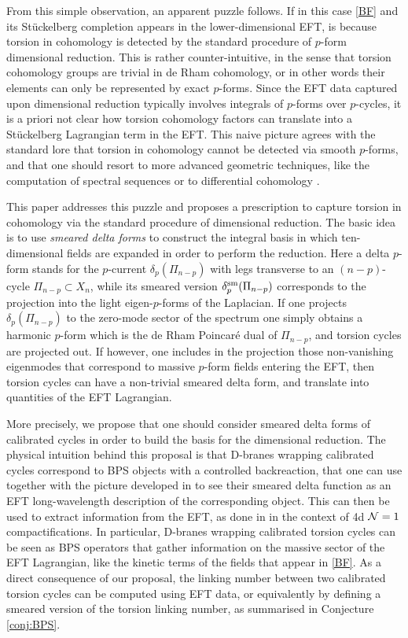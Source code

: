 \documentclass[11pt]{article}
\def\CN {{\cal N}}
\begin{document}
From this simple observation, an apparent puzzle follows. If in this case \eqref{BF} and its St\"uckelberg  completion appears in the lower-dimensional EFT, is because torsion in cohomology is detected by the standard procedure of $p$-form dimensional reduction. This is rather counter-intuitive, in the sense that torsion cohomology groups are trivial in de Rham cohomology, or in other words their elements can only be represented by exact $p$-forms. Since the EFT data captured upon dimensional reduction typically involves integrals of $p$-forms over $p$-cycles, it is a priori not clear how torsion cohomology factors can translate into a St\"uckelberg  Lagrangian term in the EFT. This naive picture agrees with the standard lore that torsion in cohomology cannot be detected via smooth $p$-forms, and that one should resort to more advanced geometric techniques, like the computation of spectral sequences  \cite{Bott1982DifferentialFI} or to differential cohomology \cite{Apruzzi:2021nmk}.


This paper addresses this puzzle and proposes a prescription to capture torsion in cohomology via the standard procedure of dimensional reduction. The basic idea is to use {\em smeared delta forms} to construct the integral basis in which ten-dimensional fields are expanded in order to perform the reduction. Here a delta $p$-form stands for the $p$-current $\delta_p(\Pi_{n-p})$ with legs transverse to an $(n-p)$-cycle $\Pi_{n-p} \subset X_n$, while its smeared version $\delta_p^{\rm sm}(\Pi_{n-p})$ corresponds to the projection into the light eigen-$p$-forms of the Laplacian. If one projects $\delta_p(\Pi_{n-p})$ to the zero-mode sector of the spectrum one simply obtains a harmonic $p$-form which is the de Rham Poincar\'e dual of $\Pi_{n-p}$, and torsion cycles are projected out. If however, one includes in the projection those non-vanishing eigenmodes that correspond to massive $p$-form fields entering the EFT, then torsion cycles can have a non-trivial smeared delta form, and translate into quantities of the EFT Lagrangian. 

More precisely, we propose that one should consider smeared delta forms of calibrated cycles in order to build the basis for the dimensional reduction. The physical intuition behind this proposal is that D-branes wrapping calibrated cycles correspond to BPS objects with a controlled backreaction, that one can use together with the picture developed in \cite{Goldberger:2001tn,Michel:2014lva,Polchinski:2015bea} to see their smeared delta function as an EFT long-wavelength description of the corresponding object.  This can then be used to extract information from the EFT, as done in \cite{Lanza:2020qmt,Lanza:2021udy,Lanza:2022zyg} in the context of 4d $\CN=1$ compactifications. In particular, D-branes wrapping calibrated torsion cycles can be seen as BPS operators that gather information on the massive sector of the EFT Lagrangian, like the kinetic terms of the fields that appear in \eqref{BF}. As a direct consequence of our proposal, the linking number between two calibrated torsion cycles can be computed using EFT data, or equivalently by defining a smeared version of the torsion linking number, as summarised in Conjecture \ref{conj:BPS}. 
\end{document}
